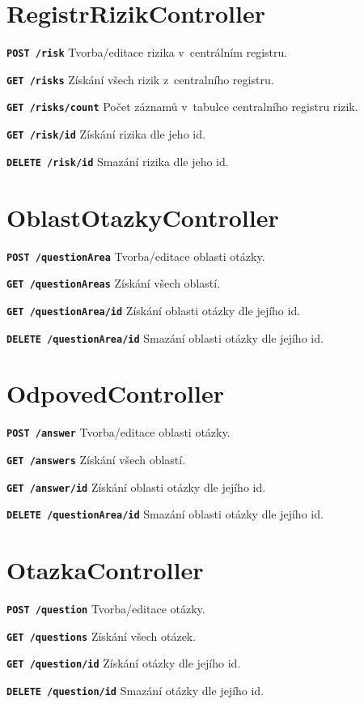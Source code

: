 \section{RegistrRizikController}
\begin{DESCRIPTION}
\item \texttt{\textbf{POST /risk}} Tvorba/editace rizika v~centrálním registru.
\item \texttt{\textbf{GET /risks}} Získání všech rizik z~centralního registru.
\item \texttt{\textbf{GET /risks/count}} Počet záznamů v~tabulce centralního registru rizik.
\item \texttt{\textbf{GET /risk/{id}}} Získání rizika dle jeho id.
\item \texttt{\textbf{DELETE /risk/{id}}} Smazání rizika dle jeho id.
\end{DESCRIPTION}

\section{OblastOtazkyController}
\begin{DESCRIPTION}
\item \texttt{\textbf{POST /questionArea}} Tvorba/editace oblasti otázky.
\item \texttt{\textbf{GET /questionAreas}} Získání všech oblastí.
\item \texttt{\textbf{GET /questionArea/{id}}} Získání oblasti otázky dle jejího id.
\item \texttt{\textbf{DELETE /questionArea/{id}}} Smazání oblasti otázky dle jejího id.
\end{DESCRIPTION}

\section{OdpovedController}
\begin{DESCRIPTION}
\item \texttt{\textbf{POST /answer}} Tvorba/editace oblasti otázky.
\item \texttt{\textbf{GET /answers}} Získání všech oblastí.
\item \texttt{\textbf{GET /answer/{id}}} Získání oblasti otázky dle jejího id.
\item \texttt{\textbf{DELETE /questionArea/{id}}} Smazání oblasti otázky dle jejího id.
\end{DESCRIPTION}

\section{OtazkaController}
\begin{DESCRIPTION}
\item \texttt{\textbf{POST /question}} Tvorba/editace otázky.
\item \texttt{\textbf{GET /questions}} Získání všech otázek.
\item \texttt{\textbf{GET /question/{id}}} Získání otázky dle jejího id.
\item \texttt{\textbf{DELETE /question/{id}}} Smazání otázky dle jejího id.
\end{DESCRIPTION}

